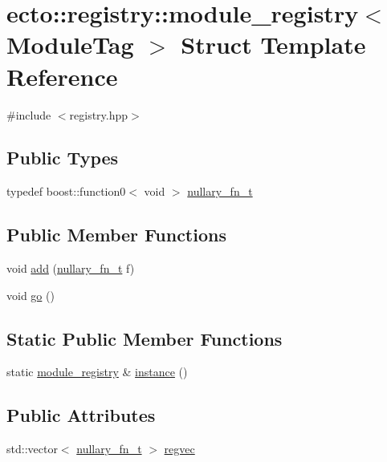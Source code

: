 \hypertarget{structecto_1_1registry_1_1module__registry}{\section{ecto\-:\-:registry\-:\-:module\-\_\-registry$<$ \-Module\-Tag $>$ \-Struct \-Template \-Reference}
\label{structecto_1_1registry_1_1module__registry}
}


{\ttfamily \#include $<$registry.\-hpp$>$}

\subsection*{\-Public \-Types}
\begin{DoxyCompactItemize}
\item 
typedef boost\-::function0$<$ void $>$ \hyperlink{structecto_1_1registry_1_1module__registry_a90fc28cbb13d6662b0b8d898985be04e}{nullary\-\_\-fn\-\_\-t}
\end{DoxyCompactItemize}
\subsection*{\-Public \-Member \-Functions}
\begin{DoxyCompactItemize}
\item 
void \hyperlink{structecto_1_1registry_1_1module__registry_aef2549c7e8d6840420041f2231dcdebf}{add} (\hyperlink{structecto_1_1registry_1_1module__registry_a90fc28cbb13d6662b0b8d898985be04e}{nullary\-\_\-fn\-\_\-t} f)
\item 
void \hyperlink{structecto_1_1registry_1_1module__registry_ab8a2255326e085adc04ad180aa1752ec}{go} ()
\end{DoxyCompactItemize}
\subsection*{\-Static \-Public \-Member \-Functions}
\begin{DoxyCompactItemize}
\item 
static \hyperlink{structecto_1_1registry_1_1module__registry}{module\-\_\-registry} \& \hyperlink{structecto_1_1registry_1_1module__registry_ac968548cf0e11339bf002828e67b857f}{instance} ()
\end{DoxyCompactItemize}
\subsection*{\-Public \-Attributes}
\begin{DoxyCompactItemize}
\item 
std\-::vector$<$ \hyperlink{structecto_1_1registry_1_1module__registry_a90fc28cbb13d6662b0b8d898985be04e}{nullary\-\_\-fn\-\_\-t} $>$ \hyperlink{structecto_1_1registry_1_1module__registry_a77ae3e886433428c82d5dbb8039d53f6}{regvec}
\end{DoxyCompactItemize}
